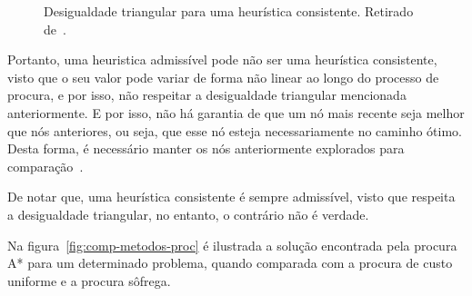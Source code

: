 \begin{figure}[H]
    \begin{center}
    \end{center}
    \caption{Desigualdade triangular para uma heurística consistente.
    Retirado de~\cite{ist:leic:resumos:procura-informada}.}
    \label{fig:heur-consistente}
\end{figure}

Portanto, uma heuristica admissível pode não ser uma heurística consistente, visto que o seu valor pode variar de forma não linear ao longo do processo de procura, e por isso, não respeitar a desigualdade triangular mencionada anteriormente.
E por isso, não há garantia de que um nó mais recente seja melhor que nós anteriores, ou seja, que esse nó esteja necessariamente no caminho ótimo.
Desta forma, é necessário manter os nós anteriormente explorados para comparação~\cite{isel:iasa:slides:proc-espaco-estados-parte-3}.

De notar que, uma heurística consistente é sempre admissível, visto que respeita a desigualdade triangular, no entanto, o contrário não é verdade.

Na figura~\ref{fig:comp-metodos-proc} é ilustrada a solução encontrada pela procura A* para um determinado problema, quando comparada com a procura de custo uniforme e a procura sôfrega.


